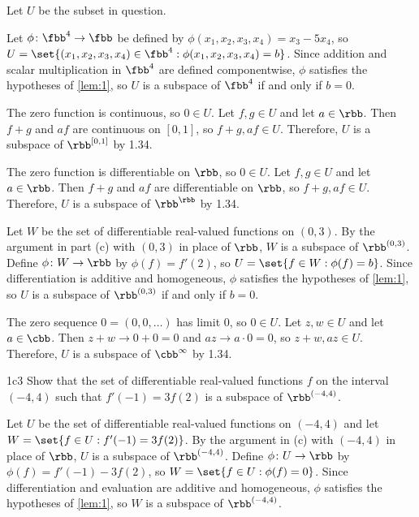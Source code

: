 \begin{sol}
    Let $U$ be the subset in question.
    \begin{subexercises}
        \item Let $\phi \colon \fbb^4 \to \fbb$ be defined by $\phi(x_1, x_2, x_3, x_4) = x_3 - 5x_4$, so $U = \set{(x_1, x_2, x_3, x_4) \in \fbb^4 : \phi(x_1, x_2, x_3, x_4) = b}$.
        Since addition and scalar multiplication in $\fbb^4$ are defined componentwise, $\phi$ satisfies the hypotheses of \autoref{lem:1}, so $U$ is a subspace of $\fbb^4$ if and only if $b = 0$.
        \item The zero function is continuous, so $0 \in U$.
        Let $f, g \in U$ and let $a \in \rbb$.
        Then $f + g$ and $af$ are continuous on $[0, 1]$, so $f + g, af \in U$.
        Therefore, $U$ is a subspace of $\rbb^{[0, 1]}$ by 1.34.
        \item The zero function is differentiable on $\rbb$, so $0 \in U$.
        Let $f, g \in U$ and let $a \in \rbb$.
        Then $f + g$ and $af$ are differentiable on $\rbb$, so $f + g, af \in U$.
        Therefore, $U$ is a subspace of $\rbb^{\rbb}$ by 1.34.
        \item Let $W$ be the set of differentiable real-valued functions on $(0, 3)$.
        By the argument in part (c) with $(0, 3)$ in place of $\rbb$, $W$ is a subspace of $\rbb^{(0, 3)}$.
        Define $\phi \colon W \to \rbb$ by $\phi(f) = f'(2)$, so $U = \set{f \in W : \phi(f) = b}$.
        Since differentiation is additive and homogeneous, $\phi$ satisfies the hypotheses of \autoref{lem:1}, so $U$ is a subspace of $\rbb^{(0, 3)}$ if and only if $b = 0$.
        \item The zero sequence $0 = (0, 0, \ldots)$ has limit $0$, so $0 \in U$.
        Let $z, w \in U$ and let $a \in \cbb$.
        Then $z + w \to 0 + 0 = 0$ and $az \to a \cdot 0 = 0$, so $z + w, az \in U$.
        Therefore, $U$ is a subspace of $\cbb^{\infty}$ by 1.34. \qedhere
    \end{subexercises}
\end{sol}

\begin{exercise}{1c3}
    Show that the set of differentiable real-valued functions $f$ on the interval $(-4, 4)$ such that $f'(-1) = 3f(2)$ is a subspace of $\rbb^{(-4, 4)}$.
\end{exercise}

\begin{sol}
    Let $U$ be the set of differentiable real-valued functions on $(-4, 4)$ and let $W = \set{f \in U : f'(-1) = 3f(2)}$.
    By the argument in (c) with $(-4, 4)$ in place of $\rbb$, $U$ is a subspace of $\rbb^{(-4, 4)}$.
    Define $\phi \colon U \to \rbb$ by $\phi(f) = f'(-1) - 3f(2)$, so $W = \set{f \in U : \phi(f) = 0}$.
    Since differentiation and evaluation are additive and homogeneous, $\phi$ satisfies the hypotheses of \autoref{lem:1}, so $W$ is a subspace of $\rbb^{(-4, 4)}$.
\end{sol}

